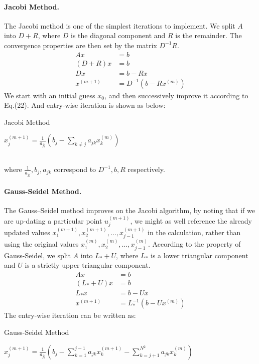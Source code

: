 \documentclass{article}
\begin{document}
\paragraph{Jacobi Method.}The Jacobi method is one of the simplest iterations to implement. We split $A$ into $D+R$, where $D$ is the diagonal component and $R$ is the remainder. The convergence properties are then set by the matrix $D^{−1}R$.
\begin{align}
    Ax&= b \\ \nonumber
    (D+R)x&= b \\ \nonumber
    Dx&= b-Rx \\ \nonumber
    x^{(m+1)}&=D^{-1}( b-Rx^{(m)})
\end{align}
We start with an initial guess $x_0$, and then successively improve it according to Eq.(22). And entry-wise iteration is shown as below:
\begin{algorithm}
    \caption{Jacobi Method}
    \begin{algorithmic}
        \State $x^{(m+1)}_j=\frac{1}{a_{jj}}(b_j-\sum_{k\not= j}a_{jk}x^{(m)}_k)$
        \EndFor
    \end{algorithmic}
\end{algorithm}
\\where $\frac{1}{a_{jj}},b_j,a_{jk}$ correspond to $D^{-1}, b, R$ respectively.
\\
\paragraph{Gauss-Seidel Method.} The Gauss–Seidel method improves on the Jacobi algorithm, by noting that if we are up-dating a particular point $u^{(m+1)}_j$, we might as well reference the already updated values $x^{(m+1)}_1,x^{(m+1)}_2,\dots,x^{(m+1)}_{j-1}$ in the calculation, rather than using the original values $x^{(m)}_1,x^{(m)}_2,\dots,x^{(m)}_{j-1}$. According to the property of Gauss-Seidel, we split $A$ into $L_*+U$, where $L_*$ is a lower triangular component and $U$ is a strictly upper triangular component.
\begin{align}
    Ax&= b \\ \nonumber
    (L_*+U)x&= b \\ \nonumber
    L_*x&= b-Ux \\ \nonumber
    x^{(m+1)}&=L_*^{-1}( b-Ux^{(m)})
\end{align}
The entry-wise iteration can be written as:
\begin{algorithm}
    \caption{Gauss-Seidel Method}
    \begin{algorithmic}
        \State $x^{(m+1)}_j=\frac{1}{a_{jj}}(b_j-\sum_{k=1}^{j-1}a_{jk}x^{(m+1)}_k-\sum_{k= j+1}^{N^2}a_{jk}x^{(m)}_k)$
        \EndFor
    \end{algorithmic}
\end{algorithm}
\\
\end{document}
